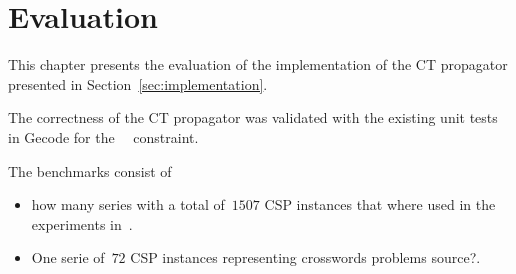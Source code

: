\documentclass[a4paper,11pt]{article}
\newcommand{\Todo}[1]{{\color{blue}#1}}
\newcommand{\Secref}[1]{Section~\ref{#1}}
\newcommand{\Chapref}[1]{Section~\ref{#1}}
\newcommand{\Table}{\Constraint{Table}~}
\newcommand{\Supports}{\texttt{supports}}
\newcommand{\Residues}{\texttt{residues}}
\newcommand{\CTpaper}[0]{DBLP:conf/cp/DemeulenaereHLP16}
\numberwithin{equation}{section}
\begin{document}










\section{Evaluation}
\label{evaluation}
This chapter presents the evaluation of the implementation of the CT propagator
presented in \Chapref{sec:implementation}. 

\label{evaluation:setup}
The correctness of the CT propagator was validated with the existing unit tests
in Gecode for the \Table~constraint.

The benchmarks consist of
\begin{itemize}
\item \Todo{how many} series 
  with a total of~$1507$ CSP instances that where used in the
  experiments in~\cite{\CTpaper}.
\item One serie of~$72$ CSP instances representing crosswords problems \Todo{source?}.
\end{itemize}
\end{document}
